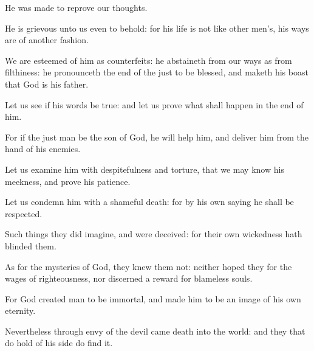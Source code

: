 {\par }{\PP {}He was made to reprove our thoughts.
\par }{\PP {}He is grievous unto us even to behold: for his life is not like other men’s, his ways are of another fashion.
\par }{\PP {}We are esteemed of him as counterfeits: he abstaineth from our ways as from filthiness: he pronounceth the end of the just to be blessed, and maketh his boast that God is his father.
\par }{\PP {}Let us see if his words be true: and let us prove what shall happen in the end of him.
\par }{\PP {}For if the just man be the son of God, he will help him, and deliver him from the hand of his enemies.
\par }{\PP {}Let us examine him with despitefulness and torture, that we may know his meekness, and prove his patience.
\par }{\PP {}Let us condemn him with a shameful death: for by his own saying he shall be respected.
\par }{\PP {}Such things they did imagine, and were deceived: for their own wickedness hath blinded them.
\par }{\PP {}As for the mysteries of God, they knew them not: neither hoped they for the wages of righteousness, nor discerned a reward for blameless souls.
\par }{\PP {}For God created man to be immortal, and made him to be an image of his own eternity.
\par }{\PP {}Nevertheless through envy of the devil came death into the world: and they that do hold of his side do find it.

}
